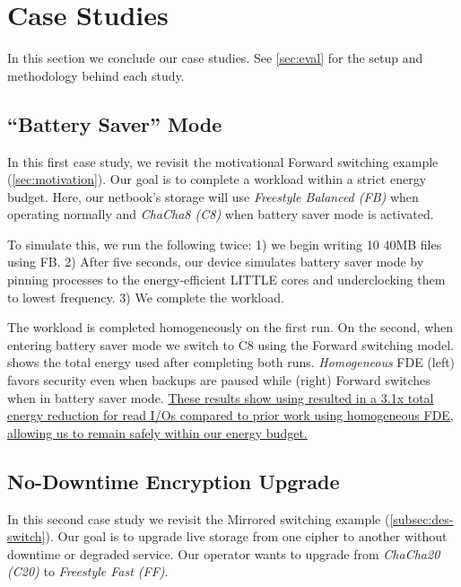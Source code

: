 \section{Case Studies}\label{sec:usecases}

In this section we conclude our case studies. See \cref{sec:eval} for the setup
and methodology behind each study.


\subsection{``Battery Saver'' Mode}\label{subsec:usecase-battery}

In this first case study, we revisit the motivational Forward switching example
(\cref{sec:motivation}). Our goal is to complete a workload within a strict
energy budget. Here, our netbook's storage will use {\em Freestyle Balanced (FB)}
when operating normally and {\em ChaCha8 (C8)} when battery saver mode is
activated.



To simulate this, we run the following twice: 1) we begin writing 10 40MB
files using FB. 2) After five seconds, our device simulates battery saver mode
by pinning \sys processes to the energy-efficient LITTLE cores and underclocking
them to lowest frequency. 3) We complete the workload.

The workload is completed homogeneously on the first run. On the second, when
entering battery saver mode we switch to C8 using the Forward switching model.
 shows the total energy used after completing both
runs. {\em Homogeneous} FDE (left) favors security even when backups are paused
while \sys (right) Forward switches when in battery saver mode. \uline{These
results show using \sys resulted in a 3.1x total energy reduction for read I/Os
compared to prior work using homogeneous FDE, allowing us to remain safely
within our energy budget.}


\subsection{No-Downtime Encryption Upgrade}\label{subsec:usecase-upgrade}

In this second case study we revisit the Mirrored switching example
(\cref{subsec:des-switch}). Our goal is to upgrade live storage from one cipher
to another without downtime or degraded service. Our operator wants to upgrade
from {\em ChaCha20 (C20)} to {\em Freestyle Fast (FF)}.


